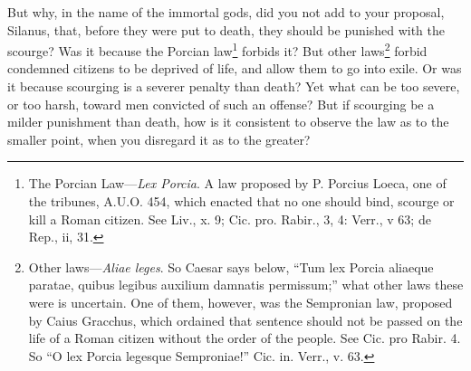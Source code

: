 But why, in the name of the immortal gods, did you not add to your
proposal, Silanus, that, before they were put to death, they should be
punished with the scourge? Was it because the Porcian law\footnote{The Porcian Law—\emph{Lex Porcia}. A law proposed by P. Porcius
Loeca, one of the tribunes, A.U.O. 454, which enacted that no one
should bind, scourge or kill a Roman citizen. See Liv., x. 9; Cic.
pro. Rabir., 3, 4: Verr., v 63; de Rep., ii, 31.} forbids
it? But other laws\footnote{Other laws—\emph{Aliae leges}. So Caesar says below, ``Tum lex
Porcia aliaeque paratae, quibus legibus auxilium damnatis permissum;''
what other laws these were is uncertain. One of them, however, was the
Sempronian law, proposed by Caius Gracchus, which ordained that
sentence should not be passed on the life of a Roman citizen without
the order of the people. See Cic. pro Rabir. 4. So ``O lex Porcia
legesque Semproniae!'' Cic. in. Verr., v. 63.} forbid condemned citizens to be deprived of
life, and allow them to go into exile. Or was it because scourging is
a severer penalty than death? Yet what can be too severe, or too
harsh, toward men convicted of such an offense? But if scourging be a
milder punishment than death, how is it consistent to observe the law
as to the smaller point, when you disregard it as to the greater?

